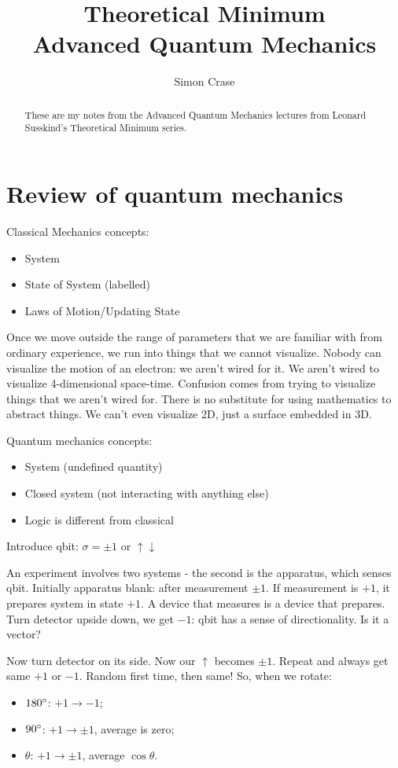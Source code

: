 \documentclass[]{article}
\title{Theoretical Minimum\\Advanced Quantum Mechanics}
\author{Simon Crase}
\begin{document}
\maketitle

\begin{abstract}
These are my notes from the Advanced Quantum Mechanics lectures from Leonard Susskind's Theoretical Minimum series.
\end{abstract}

\tableofcontents

\section{Review of quantum mechanics}

Classical Mechanics concepts:
\begin{itemize}
	\item System
	\item State of System (labelled)
	\item Laws of Motion/Updating State
\end{itemize}

Once we move outside the range of parameters that we are familiar with from ordinary experience, we run into things that we cannot visualize. Nobody can visualize the motion of an electron: we aren't wired for it. We aren't wired to visualize 4-dimensional space-time. Confusion comes from trying to visualize things that we aren't wired for. There is no substitute for using mathematics to abstract things. We can't even visualize 2D, just a surface embedded in 3D. 

Quantum mechanics concepts:
\begin{itemize}
	\item System (undefined quantity)
	\item Closed system (not interacting with anything else)
	\item Logic is different from classical
\end{itemize}

Introduce qbit: $\sigma=\pm1$ or $\uparrow\downarrow$

An experiment involves two systems - the second is the apparatus, which senses qbit. Initially apparatus blank: after measurement $\pm1$. If measurement is $+1$, it prepares system in state $+1$. A device that measures is a device that prepares. Turn detector upside down, we get $-1$: qbit has a sense of directionality. Is it a vector?

Now turn detector on its side. Now our $\uparrow$ becomes  $\pm1$. Repeat and always get same $+1$ or $-1$. Random first time, then same! So, when we rotate:
\begin{itemize}
	\item $180\degree$: $+1\rightarrow-1$;
	\item $90\degree$: $+1\rightarrow\pm1$, average is zero;
	\item $\theta$: $+1\rightarrow\pm1$, average $\cos \theta$.
\end{itemize}
\end{document}

